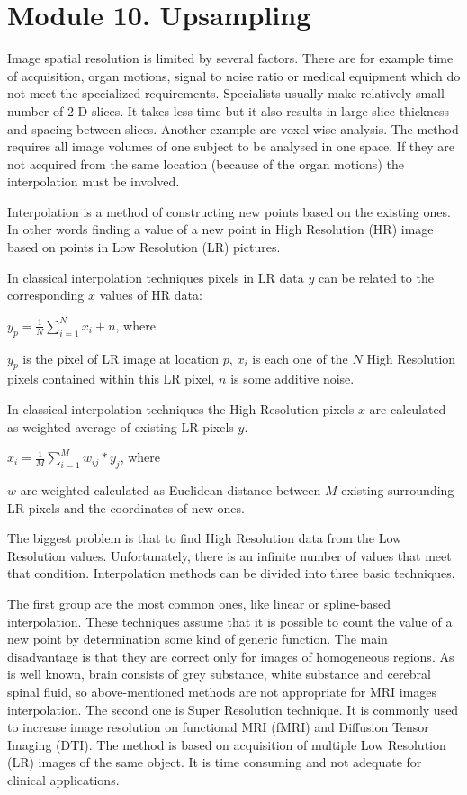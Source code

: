 \section{Module 10. Upsampling}

Image spatial resolution is limited by several factors. There are for example time of acquisition, organ motions, signal to noise ratio or medical equipment which do not meet the specialized requirements. Specialists usually make relatively small number of 2-D slices. It takes less time but it also results in large slice thickness and spacing between slices. Another example are voxel-wise analysis. The method requires all image volumes of one subject to be analysed in one space. If they are not acquired from the same location (because of the organ motions) the interpolation must be involved.

Interpolation is a method of constructing new points based on the
existing ones. In other words finding a value of a new point in High
Resolution (HR) image based on points in Low Resolution (LR) pictures.

In classical interpolation techniques pixels in LR data $y$ can be
related to the corresponding $x$ values of HR data:
\newline
\centerline {$y_{p}=\frac{1}{N}\sum_{i=1}^{N}x_{i}+n$, where }
\newline
\newline $y_{p}$ is the pixel of LR image at location $p$, \newline $x_{i}$ is each one of the $N$ High Resolution pixels contained within this
LR pixel,
\newline $n$ is some additive noise.

In classical interpolation techniques the High Resolution pixels $x$ are calculated as weighted average of existing LR pixels $y$.
\newline \centerline{$x_{i}=\frac{1}{M}\sum_{i=1}^{M}w_{ij}*y_{j}$, where}
\newline
\newline $w$ are weighted calculated as Euclidean distance between $M$ existing surrounding LR pixels and the coordinates of new ones.   

The biggest problem is that to find High Resolution data from the
Low Resolution values. Unfortunately, there is an infinite number
of values that meet that condition. Interpolation methods can be divided
into three basic techniques.

The first group are the most common ones, like linear or spline-based
interpolation. These techniques assume that it is possible to count
the value of a new point by determination some kind of generic function.
The main disadvantage is that they are correct only for images of
homogeneous regions. As is well known, brain consists of grey substance,
white substance and cerebral spinal fluid, so above-mentioned methods
are not appropriate for MRI images interpolation. The second one is
Super Resolution technique. It is commonly used to increase image
resolution on functional MRI (fMRI) and Diffusion Tensor Imaging (DTI).
The method is based on acquisition of multiple Low Resolution (LR)
images of the same object. It is time consuming and not adequate for
clinical applications.

